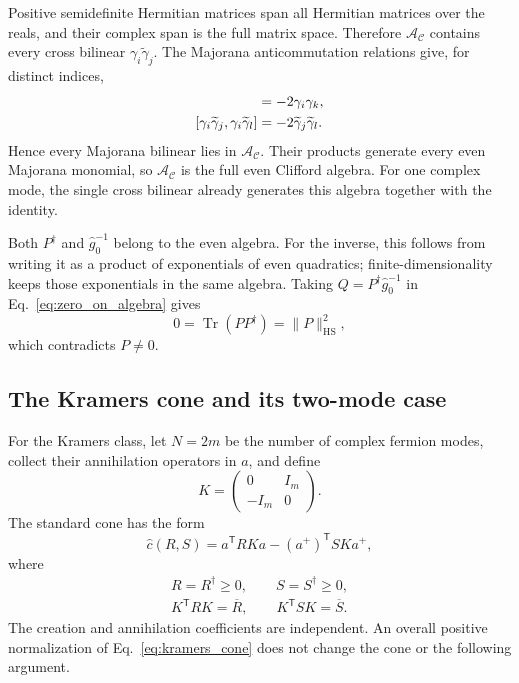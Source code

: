 \documentclass[11pt,a4paper]{article}
\newcommand{\Tr}{\operatorname{Tr}}
\newcommand{\trans}{\mathsf T}
\newcommand{\mc}[1]{\mathcal{#1}}
\newcommand{\HS}{\mathrm{HS}}
\theoremstyle{remark}
\numberwithin{equation}{section}
\begin{document}
Positive semidefinite Hermitian matrices span all Hermitian matrices over
the reals, and their complex span is the full matrix space. Therefore
\(\mc A_{\mc C}\) contains every cross bilinear
\(\gamma_i\widetilde\gamma_j\). The Majorana anticommutation relations
give, for distinct indices,
\begin{align}
[\gamma_i\widetilde\gamma_j,\gamma_k\widetilde\gamma_j]
&=-2\gamma_i\gamma_k,\notag\\
[\gamma_i\widetilde\gamma_j,\gamma_i\widetilde\gamma_l]
&=-2\widetilde\gamma_j\widetilde\gamma_l.
\label{eq:majorana_commutators}
\end{align}
Hence every Majorana bilinear lies in \(\mc A_{\mc C}\). Their products
generate every even Majorana monomial, so \(\mc A_{\mc C}\) is the full
even Clifford algebra. For one complex mode, the single cross bilinear
already generates this algebra together with the identity.

Both \(P^\dagger\) and \(\hat g_0^{-1}\) belong to the even algebra.
For the inverse, this follows from writing it as a product of exponentials
of even quadratics; finite-dimensionality keeps those exponentials in the
same algebra. Taking \(Q=P^\dagger\hat g_0^{-1}\) in
Eq.~\eqref{eq:zero_on_algebra} gives
\begin{equation}
0=\Tr(PP^\dagger)=\|P\|_{\HS}^2,
\label{eq:hilbert_schmidt_contradiction}
\end{equation}
which contradicts \(P\ne0\).

\subsection{The Kramers cone and its two-mode case}

For the Kramers class, let \(N=2m\) be the number of complex fermion modes,
collect their annihilation operators in \(a\), and define
\begin{equation}
K=\begin{pmatrix}0&I_m\\-I_m&0\end{pmatrix}.
\label{eq:kramers_K}
\end{equation}
The standard cone has the form~\cite{wei2024prb}
\begin{equation}
\hat c(R,S)=a^\trans RK a-(a^+)^\trans SK a^+,
\label{eq:kramers_cone}
\end{equation}
where
\begin{equation}
\begin{gathered}
R=R^\dagger\geq0,\qquad S=S^\dagger\geq0,\\
K^\trans R K=\overline R,\qquad
K^\trans S K=\overline S.
\end{gathered}
\label{eq:kramers_coefficients}
\end{equation}
The creation and annihilation coefficients are independent. An overall
positive normalization of Eq.~\eqref{eq:kramers_cone} does not change the
cone or the following argument.
\end{document}
